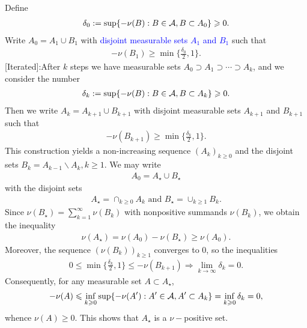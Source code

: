 \documentclass{report}
\begin{document}
\begin{myproof}
    Define
    \begin{align*}
        \delta_0:=\sup\{-\nu(B):B\in\mathcal A,B\subset A_0\}\geqslant 0.
    \end{align*}Write $A_0=A_1\cup B_1$ with \textcolor{blue}{disjoint measurable sets $A_1$ and $B_1$} such that
    \begin{align*}
        -\nu(B_1)\geq\min\{\frac{\delta_0}{2},1\}.
    \end{align*}[Iterated]:After $k$ steps we have measurable sets $A_0\supset A_1\supset\cdots\supset A_k$, and we consider the number 
    \begin{align*}
        \delta_k:=\sup\{-\nu(B):B\in\mathcal A,B\subset A_k\}\geqslant 0.
    \end{align*}Then we write $A_k=A_{k+1}\cup B_{k+1}$ with disjoint measurable sets $A_{k+1}$ and $B_{k+1}$ such that 
    \begin{align*}
        -\nu(B_{k+1})\geq\min\{\frac{\delta_k}{2},1\}.
    \end{align*}This construction yields a non-increasing sequence $(A_k)_{k\geq 0}$ and the disjoint sets $B_k=A_{k-1}\backslash A_k,k\geq 1$. We may write 
    \begin{align*}
        A_0=A_{\star}\cup B_{\star}
    \end{align*}with the disjoint sets
    \begin{align*}
        A_{\star}=\cap_{k\geq 0}A_k\text{ and }B_{\star}=\cup_{k\geq 1}B_k.
    \end{align*}Since $\nu(B_{\star})=\sum_{k=1}^{\infty}\nu(B_k)$ with nonpositive summands $\nu(B_k)$, we obtain the inequality
    \begin{align*}
        \nu(A_{\star})=\nu(A_0)-\nu(B_{\star})\geq\nu(A_0).
    \end{align*}Moreover, the sequence $(\nu(B_k))_{k\geq 1}$ converges to $0$, so the inequalities 
    \begin{align*}
       0\leq \min\{\frac{\delta_k}{2},1\}\leq -\nu(B_{k+1})\Rightarrow \lim_{k\to\infty}\delta_k=0.
    \end{align*}Consequently, for any measurable set $A\subset A_{\star}$,
    \begin{align*}
        -\nu(A)\leqslant\inf_{k\geqslant 0}\sup\{-\nu(A'):A'\in\mathcal A,A'\subset A_k\}=\inf_{k\geqslant 0}\delta_k=0,
    \end{align*}whence $\nu(A)\geq0$. This shows that $A_{\star}$ is a $\nu-$positive set.
\end{myproof}
\end{document}
